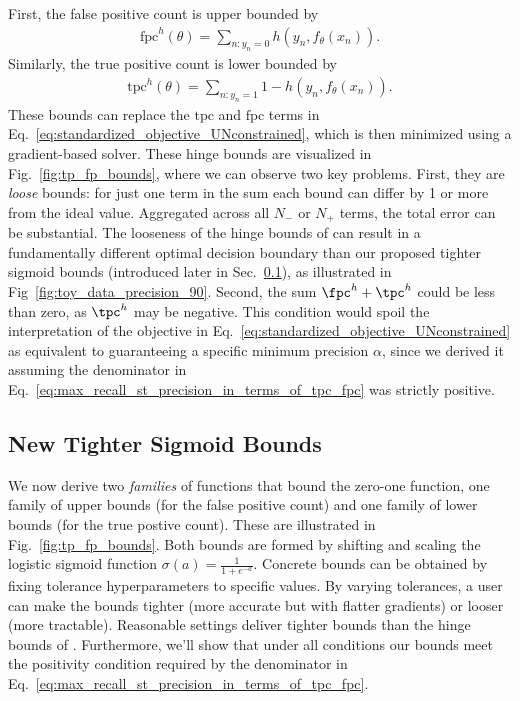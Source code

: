 First, the false positive count is upper bounded by
\begin{align}
	\text{fpc}^{h}(\theta) = \textstyle \sum_{n : y_n = 0} h(y_n, f_{\theta}(x_n) ).
\end{align}
Similarly, the true positive count is lower bounded by
\begin{align}
	\text{tpc}^{h}(\theta) = \textstyle \sum_{n : y_n = 1} 1 - h(y_n, f_{\theta}(x_n) ).
\end{align}
These bounds can replace the $\text{tpc}$ and $\text{fpc}$ terms in Eq.~\eqref{eq:standardized_objective_UNconstrained}, which is then minimized using a gradient-based solver.
These hinge bounds are visualized in Fig.~\ref{fig:tp_fp_bounds}, where we can observe two key problems.
First, they are \emph{loose} bounds: for just one term in the sum each bound can differ by 1 or more from the ideal value.
Aggregated across all $N_{-}$ or $N_{+}$ terms, the total error can be substantial.
The looseness of the hinge bounds of \citet{ebanScalableLearningNonDecomposable2017} can result in a fundamentally different optimal decision boundary than our proposed tighter sigmoid bounds (introduced later in Sec.~\ref{sec:methods_sigmoid}), as illustrated in Fig~\ref{fig:toy_data_precision_90}.
Second, the sum $\fpc^h + \tpc^h$ could be less than zero, as $\tpc^h$ may be negative. This condition would spoil the interpretation of the objective in Eq.~\eqref{eq:standardized_objective_UNconstrained} as equivalent to guaranteeing a specific minimum precision $\alpha$, since we derived it assuming the denominator in Eq.~\eqref{eq:max_recall_st_precision_in_terms_of_tpc_fpc} was strictly positive.


\subsection{New Tighter Sigmoid Bounds}
\label{sec:methods_sigmoid}

We now derive two \emph{families} of functions that bound the zero-one function, one family of upper bounds (for the false positive count) and one family of lower bounds (for the true postive count). These are illustrated in Fig.~\ref{fig:tp_fp_bounds}. 
Both bounds are formed by shifting and scaling the logistic sigmoid function $\sigma(a) = \textstyle \frac{1}{1 + e^{-a}}$.
Concrete bounds can be obtained by fixing tolerance hyperparameters to specific values. By varying tolerances, a user can make the bounds tighter (more accurate but with flatter gradients) or looser (more tractable). Reasonable settings deliver tighter bounds than the hinge bounds of \citet{ebanScalableLearningNonDecomposable2017}.
Furthermore, we'll show that under all conditions our bounds meet the positivity condition required by the denominator in Eq.~\eqref{eq:max_recall_st_precision_in_terms_of_tpc_fpc}.

